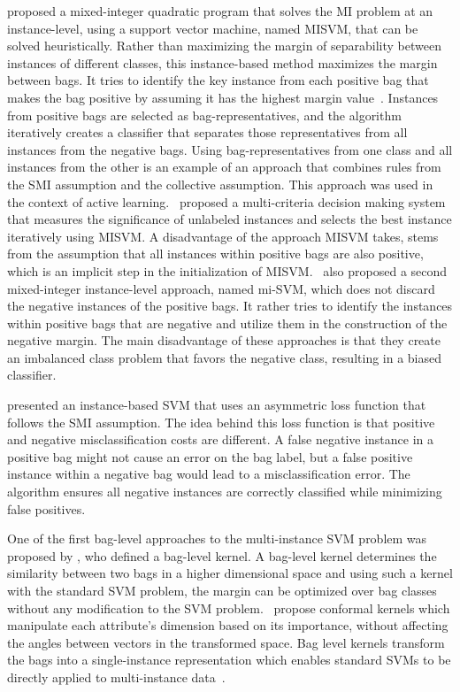 \documentclass[preprint,12pt]{elsarticle}
\begin{document}
\citet{Andrews2002} proposed a mixed-integer quadratic program that solves the MI problem at an instance-level, using a support vector machine, named MISVM, that can be solved heuristically. Rather than maximizing the margin of separability between instances of different classes, this instance-based method maximizes the margin between bags. It tries to identify the key instance from each positive bag that makes the bag positive by assuming it has the highest margin value~\citep{Herrera2016}. Instances from positive bags are selected as bag-representatives, and the algorithm iteratively creates a classifier that separates those representatives from all instances from the negative bags. Using bag-representatives from one class and all instances from the other is an example of an approach that combines rules from the SMI assumption and the collective assumption. This approach was used in the context of active learning.~\citet{Wang20143106} proposed a multi-criteria decision making system that measures the significance of unlabeled instances and selects the best instance iteratively using MISVM. A disadvantage of the approach MISVM takes, stems from the assumption that all instances within positive bags are also positive, which is an implicit step in the initialization of MISVM.~\citet{Andrews2002} also proposed a second mixed-integer instance-level approach, named mi-SVM, which does not discard the negative instances of the positive bags. It rather tries to identify the instances within positive bags that are negative and utilize them in the construction of the negative margin. The main disadvantage of these approaches is that they create an imbalanced class problem that favors the negative class, resulting in a biased classifier.

\citet{Yang2006} presented an instance-based SVM that uses an asymmetric loss function that follows the SMI assumption. The idea behind this loss function is that positive and negative misclassification costs are different. A false negative instance in a positive bag might not cause an error on the bag label, but a false positive instance within a negative bag would lead to a misclassification error. The algorithm ensures all negative instances are correctly classified while minimizing false positives.

One of the first bag-level approaches to the multi-instance SVM problem was proposed by \citet{Smola2002}, who defined a bag-level kernel. A bag-level kernel determines the similarity between two bags in a higher dimensional space and using such a kernel with the standard SVM problem, the margin can be optimized over bag classes without any modification to the SVM problem.~\citet{Blaschko2006} propose conformal kernels which manipulate each attribute's dimension based on its importance, without affecting the angles between vectors in the transformed space. Bag level kernels transform the bags into a single-instance representation which enables standard SVMs to be directly applied to multi-instance data~\citep{Herrera2016}. 
\end{document}
